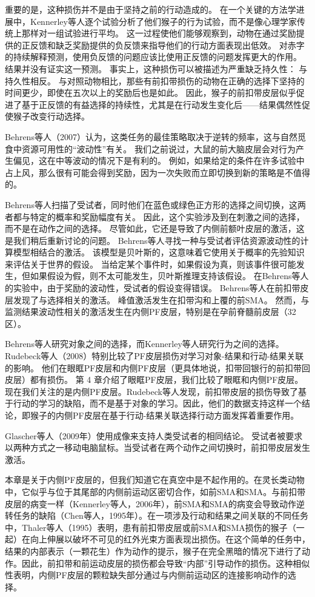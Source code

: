 重要的是，这种损伤并不是由于坚持之前的行动造成的。
在一个关键的方法学进展中，Kennerley等人逐个试验分析了他们猴子的行为试验，而不是像心理学家传统上那样对一组试验进行平均。
这一过程使他们能够观察到，动物在通过奖励提供的正反馈和缺乏奖励提供的负反馈来指导他们的行动方面表现出低效。
对赤字的持续解释预测，使用负反馈的问题应该比使用正反馈的问题发挥更大的作用。
结果并没有证实这一预测。
事实上，这种损伤可以被描述为严重缺乏持久性：
与持久性相反。
与对照动物相比，那些有前扣带损伤的动物在正确的选择下坚持的时间更少，即使在五次以上的奖励后也是如此。
因此，猴子的前扣带皮层似乎促进了基于正反馈的有益选择的持续性，尤其是在行动发生变化后——结果偶然性促使猴子改变行动选择。\par


Behrens等人（2007）认为，这类任务的最佳策略取决于逆转的频率，这与自然觅食中资源可用性的“波动性”有关。
我们之前说过，大鼠的前大脑皮层会对行为产生偏见，这在中等波动的情况下是有利的。
例如，如果给定的条件在许多试验中占上风，那么很有可能会得到奖励，因为一次失败而立即切换到新的策略是不值得的。\par


Behrens等人扫描了受试者，同时他们在蓝色或绿色正方形的选择之间切换，这两者都与特定的概率和奖励幅度有关。
因此，这个实验涉及到在刺激之间的选择，而不是在动作之间的选择。
尽管如此，它还是导致了内侧前额叶皮层的激活，这是我们稍后重新讨论的问题。
Behrens等人寻找一种与受试者评估资源波动性的计算模型相结合的激活。
该模型是贝叶斯的，这意味着它使用关于概率的先验知识来评估关于世界的假设。
当给定某个事件时，如果假设为真，则该事件很可能发生，但如果假设为假，则不太可能发生，贝叶斯推理支持该假设。
在Behrens等人的实验中，由于奖励的波动性，受试者的假设变得错误。
Behrens等人在前扣带皮层发现了与选择相关的激活。
峰值激活发生在扣带沟和上覆的前SMA。
然而，与监测结果波动性相关的激活发生在内侧PF皮层，特别是在孕前脊髓前皮层（32区）。\par


Behrens等人研究对象之间的选择，而Kennerley等人研究行为之间的选择。
Rudebeck等人（2008）特别比较了PF皮层损伤对学习对象-结果和行动-结果关联的影响。
他们在眼眶PF皮层和内侧PF皮层（更具体地说，扣带回银行的前扣带回皮层）都有损伤。
第 4 章介绍了眼眶PF皮层，我们比较了眼眶和内侧PF皮层。现在我们关注的是内侧PF皮层。Rudebeck等人发现，前扣带皮层的损伤导致了基于行动的学习的缺陷，而不是基于对象的学习。因此，他们的数据支持这样一个结论，即猴子的内侧PF皮层在基于行动-结果关联选择行动方面发挥着重要作用。\par
Glascher等人（2009年）使用成像来支持人类受试者的相同结论。
受试者被要求以两种方式之一移动电脑鼠标。当受试者在两个动作之间切换时，前扣带皮层发生激活。\par
本章是关于内侧PF皮层的，但我们知道它在真空中是不起作用的。在灵长类动物中，它似乎与位于其尾部的内侧前运动区密切合作，如前SMA和SMA。与前扣带皮层的病变一样（Kennerley等人，2006年），前SMA和SMA的病变会导致动作逆转任务的缺陷（Chen等人，1995年）。在一项涉及行动和结果之间关联的不同任务中，Thaler等人（1995）表明，患有前扣带皮层或前SMA和SMA损伤的猴子（一起）在向上伸展以破坏不可见的红外光束方面表现出损伤。在这个简单的任务中，结果的内部表示（一颗花生）作为动作的提示，猴子在完全黑暗的情况下进行了动作。因此，前扣带和前运动皮层的损伤都会导致“内部”引导动作的损伤。这种相似性表明，内侧PF皮层的颗粒缺失部分通过与内侧前运动区的连接影响动作的选择。\par

